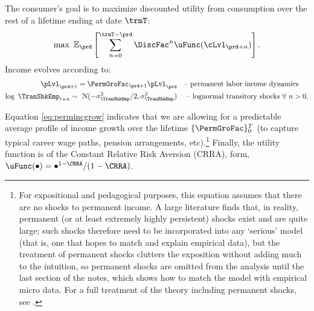 The consumer's goal is to maximize discounted utility from consumption over the rest of a lifetime ending at date $\trmT$:
  \begin{equation}\label{eq:MaxProb}
    \max~{\Ex}_{\prd}\left[\sum_{n=0}^{\trmT-\prd}{\DiscFac}^{n} \uFunc({\cLvl}_{\prd+n})\right].
  \end{equation}
Income evolves according to: 
  \begin{equation}\begin{gathered}\begin{aligned}
        \pLvl_{\prd+1}  = \PermGroFac_{\prd+1}\pLvl_{\prd}  &  \text{~~ -- permanent labor income dynamics} \label{eq:permincgrow}
        \\ \log ~ \TranShkEmp_{t+n} \sim ~\mathcal{N}(-\sigma_{\TranShkEmp}^{2}/2,\sigma_{\TranShkEmp}^{2}) & \text{~~~ -- lognormal transitory shocks}~\forall~n>0 .
      \end{aligned}\end{gathered}\end{equation}

Equation \eqref{eq:permincgrow} indicates that we are allowing for a predictable average profile of income growth over the lifetime $\{\PermGroFac\}_{0}^{T}$ (to capture typical career wage paths, pension arrangements, etc).\footnote{For expositional and pedagogical purposes, this equation assumes that there are no shocks to permanent income.  A large literature finds that, in reality, permanent (or at least extremely highly persistent) shocks exist and are quite large; such shocks therefore need to be incorporated into any `serious' model (that is, one that hopes to match and explain empirical data), but the treatment of permanent shocks clutters the exposition without adding much to the intuition, so permanent shocks are omitted from the analysis until the last section of the notes, which shows how to match the model with empirical micro data.  For a full treatment of the theory including permanent shocks, see \cite{BufferStockTheory}.}  Finally, the utility function is of the Constant Relative Risk Aversion (CRRA), form, $\uFunc(\bullet) = \bullet^{1-\CRRA}/(1-\CRRA)$.

